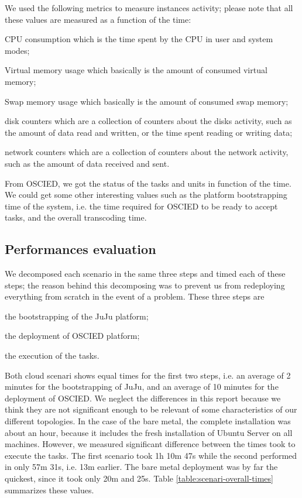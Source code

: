 \documentclass[a4paper, titlepage]{paper}
\numberwithin{figure}{section}
\numberwithin{table}{section}
\begin{document}
    We used the following metrics to measure instances activity; please note that all these values are measured as a function of the time:
    \begin{description*}
      \item[CPU consumption] which is the time spent by the CPU in user and system modes;
      \item[Virtual memory usage] which basically is the amount of consumed virtual memory;
      \item[Swap memory usage] which basically is the amount of consumed swap memory;
      \item[disk counters] which are a collection of counters about the disks activity, such as the amount of data read and written, or the time spent reading or writing data;
      \item[network counters] which are a collection of counters about the network activity, such as the amount of data received and sent.
    \end{description*}
    From OSCIED, we got the status of the tasks and units in function of the time. We could get some other interesting values such as the platform bootstrapping time of the system, i.e. the time required for OSCIED to be ready to accept tasks, and the overall transcoding time.

    \subsection{Performances evaluation}\label{perf-eval}
      We decomposed each scenario in the same three steps and timed each of these steps; the reason behind this decomposing was to prevent us from redeploying everything from scratch in the event of a problem. These three steps are
      \begin{inparaenum}[1.]
        \item the bootstrapping of the JuJu platform;
        \item the deployment of OSCIED platform;
        \item the execution of the tasks.
      \end{inparaenum}
      
      Both cloud scenari shows equal times for the first two steps, i.e. an average of 2 minutes for the bootstrapping of JuJu, and an average of 10 minutes for the deployment of OSCIED. We neglect the differences in this report because we think they are not significant enough to be relevant of some characteristics of our different topologies. In the case of the bare metal, the complete installation was about an hour, because it includes the fresh installation of Ubuntu Server on all machines. However, we measured significant difference between the times took to execute the tasks. The first scenario took 1h 10m 47s while the second performed in only 57m 31s, i.e. 13m earlier. The bare metal deployment was by far the quickest, since it took only 20m and 25s. Table \ref{table:scenari-overall-times} summarizes these values.
\end{document}
